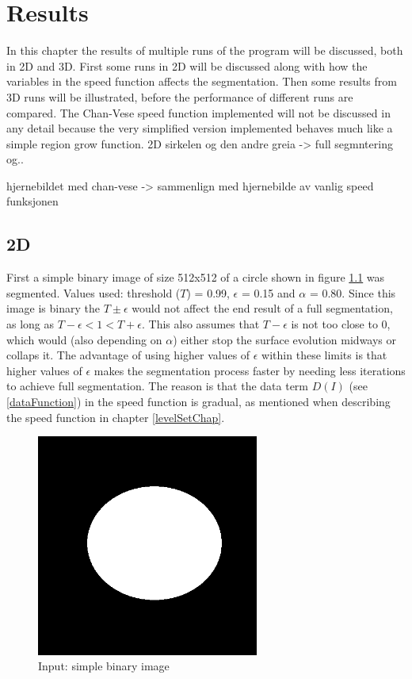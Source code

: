 \chapter{Results}
In this chapter the results of multiple runs of the program will be discussed, both in 2D and 3D. First some runs in 2D will be discussed along with how the variables in the speed function affects the segmentation. Then some results from 3D runs will be illustrated, before the performance of different runs are compared. The Chan-Vese speed function implemented will not be discussed in any detail because the very simplified version implemented behaves much like a simple region grow function.
2D    
sirkelen og den andre greia -> full segmntering og..    

hjernebildet med chan-vese -> sammenlign med hjernebilde av vanlig speed funksjonen   

\section{2D}
First a simple binary image of size 512x512 of a circle shown in figure \ref{circle} was segmented. Values used: threshold ($T$) = 0.99, $\epsilon$ = 0.15 and $\alpha$ = 0.80. Since this image is binary the $T \pm \epsilon$ would not affect the end result of a full segmentation, as long as $T - \epsilon < 1 < T + \epsilon$. This also assumes that $T - \epsilon$ is not too close to 0, which would (also depending on $\alpha$) either stop the surface evolution midways or collaps it. The advantage of using higher values of $\epsilon$ within these limits is that higher values of $\epsilon$ makes the segmentation process faster by needing less iterations to achieve full segmentation. The reason is that the data term $D(I)$ (see \ref{dataFunction}) in the speed function is gradual, as mentioned when describing the speed function in chapter \ref{levelSetChap}.
\begin{figure}[h!]
\centering
\includegraphics[width=0.65\textwidth]{results/circle}
\caption{Input: simple binary image}
\label{circle}
\end{figure} 

